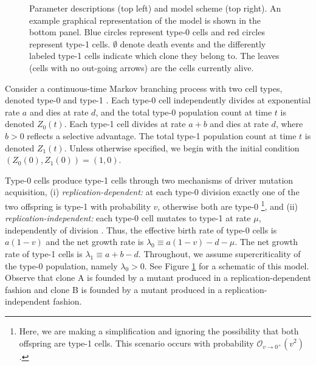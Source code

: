 \documentclass{article}
\numberwithin{equation}{section}
\begin{document}
\begin{figure}[H]
    \begin{minipage}{\textwidth}
      \centering
    \end{minipage}
    \caption{Parameter descriptions (top left) and model scheme (top right). An example graphical representation of the model is shown in the bottom panel. Blue circles represent type-0 cells and red circles represent type-1 cells. $\emptyset$ denote death events and the differently labeled type-1 cells indicate which clone they belong to. The leaves (cells with no out-going arrows) are the cells currently alive.}
    \label{fig:model}
\end{figure}


Consider a continuous-time Markov branching process with two cell types, denoted type-0 and type-1 \cite{athreya1972}. Each type-0 cell independently divides at exponential rate $a$ and dies at rate $d$,  and the total type-0 population count at time $t$ is denoted $Z_0(t)$. Each type-1 cell  divides at rate $a+b$ and dies at rate $d$, where $b>0$ reflects a selective advantage. The total type-1 population count at time $t$ is denoted $Z_1(t)$. Unless otherwise specified, we begin with the initial condition $(Z_0(0),Z_1(0))=(1,0)$.


Type-0 cells produce type-1 cells through two mechanisms of driver mutation acquisition, (i) {\it replication-dependent:} at each type-0 division exactly one of the two offspring is type-1 with probability $v$, otherwise both are type-0 \footnote{Here, we are making a simplification and ignoring the possibility that both offspring are type-1 cells. This scenario occurs with probability $\mathcal{O}_{v\to 0^+}(v^2)$.}, and (ii) {\it replication-independent:} each type-0 cell mutates to type-1 at rate $\mu$, independently of division \cite{abascal2021}. Thus, the effective birth rate of type-0 cells is $a(1-v)$ and the net growth rate is $\lambda_0 \equiv a(1-v)-d-\mu$. The net growth rate of type-1 cells is $\lambda_1 \equiv a+b-d$. Throughout, we assume supercriticality of the type-$0$ population, namely $\lambda_0>0$. See Figure \ref{fig:model} for a schematic of this model. Observe that clone A is founded by a mutant produced in a replication-dependent fashion and clone B is founded by a mutant produced in a replication-independent fashion. 
\end{document}
